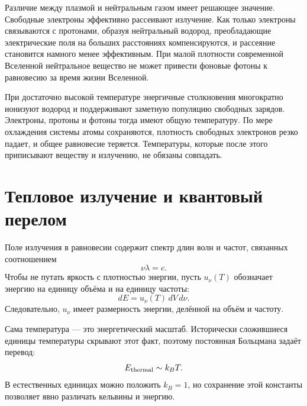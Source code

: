Различие между плазмой и нейтральным газом имеет решающее значение. Свободные электроны эффективно рассеивают излучение. Как только электроны связываются с протонами, образуя нейтральный водород, преобладающие электрические поля на больших расстояниях компенсируются, и рассеяние становится намного менее эффективным. При малой плотности современной Вселенной нейтральное вещество не может привести фоновые фотоны к равновесию за время жизни Вселенной.

При достаточно высокой температуре энергичные столкновения многократно ионизуют водород и поддерживают заметную популяцию свободных зарядов. Электроны, протоны и фотоны тогда имеют общую температуру. По мере охлаждения системы атомы сохраняются, плотность свободных электронов резко падает, и общее равновесие теряется. Температуры, которые после этого приписывают веществу и излучению, не обязаны совпадать.

\begin{classroomqa}
\end{classroomqa}

\section{Тепловое излучение и квантовый перелом}

Поле излучения в равновесии содержит спектр длин волн и частот, связанных соотношением
\begin{equation}
\nu\lambda=c.
\end{equation}
Чтобы не путать яркость с плотностью энергии, пусть \(u_\nu(T)\) обозначает энергию на единицу объёма и на единицу частоты:
\begin{equation}
dE=u_\nu(T)\,dV\,d\nu.
\label{eq:c07-spectral-density}
\end{equation}
Следовательно, \(u_\nu\) имеет размерность энергии, делённой на объём и частоту.

Сама температура — это энергетический масштаб. Исторически сложившиеся единицы температуры скрывают этот факт, поэтому постоянная Больцмана задаёт перевод:
\begin{equation}
E_{\rm thermal}\sim k_B T.
\end{equation}
В естественных единицах можно положить \(k_B=1\), но сохранение этой константы позволяет явно различать кельвины и энергию.

